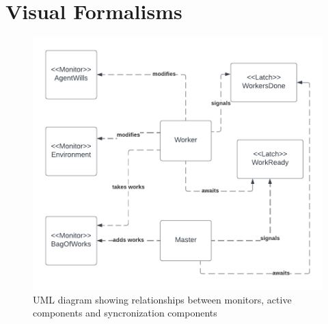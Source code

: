 \documentclass[12pt, a4paper]{report}
\begin{document}
\section{Visual Formalisms}
\begin{figure}
    \centering
    \includegraphics{UML1.png}
    \caption{UML diagram showing relationships between monitors, active components and syncronization components}
\end{figure}
\end{document}

